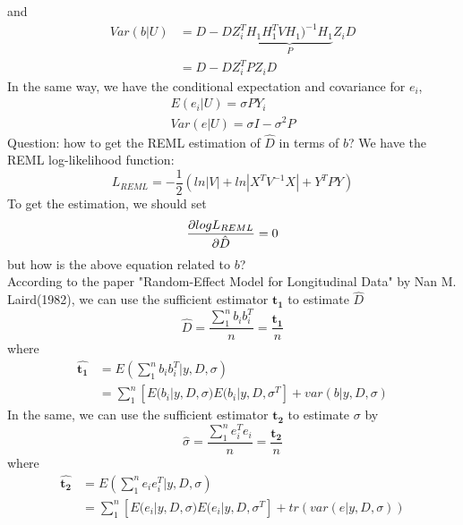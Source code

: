 \documentclass[12pt]{article}
\begin{document}
    and
    \begin{equation}
    \begin{split}
        Var(b|U)&=D-DZ_i^T\underbrace{H_1H_1^TVH_1)^{-1}H_1}_{P}Z_iD\\
        &=D-DZ_i^TPZ_iD
    \end{split}
    \end{equation}
    In the same way, we have the conditional expectation and covariance for $e_i$,
    \begin{align}
        E(e_i|U)=\sigma PY_i\\
        Var(e|U)=\sigma I-\sigma^2P
    \end{align}
    Question: how to get the REML estimation of $\hat{D}$ in terms of $b$? We have the REML log-likelihood function:
    \begin{equation*}
        L_{REML}=-\frac{1}{2}(ln|V|+ln|X^TV^{-1}X|+Y^TPY)
    \end{equation*}
    To get the estimation, we should set
    \begin{equation*}
        \dfrac{\partial log L_{REML}}{\partial \hat{D}}=0\\
    \end{equation*}
    but how is the above equation related to $b$?\\
    According to the paper "Random-Effect Model for Longitudinal Data" by Nan M. Laird(1982), we can use the sufficient estimator $\mathbf{t_1}$ to estimate $\hat{D}$
    \begin{equation}
        \hat{D}=\frac{\sum_1^nb_ib_i^T}{n}=\frac{\mathbf{t_1}}{n}
    \end{equation} 
    where
    \begin{equation}
    \begin{split}
        \hat{\mathbf{t_1}}&=E(\sum_1^nb_ib_i^T|y,D,\sigma)\\
        &=\sum_1^n[E(b_i|y,D,\sigma)E(b_i|y,D,\sigma^T]+var(b|y,D,\sigma)
    \end{split}
    \end{equation}
    In the same, we can use the sufficient estimator $\mathbf{t_2}$ to estimate $\sigma$ by
    \begin{equation}
        \hat{\sigma}=\frac{\sum_1^ne_i^Te_i}{n}=\frac{\mathbf{t_2}}{n}
    \end{equation}
    where
    \begin{equation}
    \begin{split}
        \hat{\mathbf{t_2}}&=E(\sum_1^ne_ie_i^T|y,D,\sigma)\\
        &=\sum_1^n[E(e_i|y,D,\sigma)E(e_i|y,D,\sigma^T]+tr(var(e|y,D,\sigma))
    \end{split}
    \end{equation}
\end{document}
